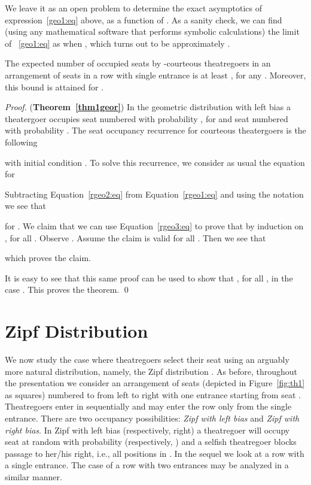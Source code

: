 \documentclass[11pt]{llncs}
\begin{document}
We leave it as an open problem to determine the exact asymptotics of expression~\eqref{geo1:eq} above, as a function of . As a sanity check, we can find (using any mathematical software that performs symbolic calculations) the limit of ~\eqref{geo1:eq} as  when , which turns out to be approximately . 



\begin{theorem}
\label{thm1geor}
The expected number of occupied seats by -courteous 
theatregoers in an arrangement of  seats
in a row with single entrance is at least , 
for any . Moreover, this bound is attained for .
\end{theorem}




\begin{proof} ({\bf Theorem~\ref{thm1geor}})
In the geometric distribution with left bias a theatergoer
occupies seat numbered  with probability
, for  and seat numbered 
with probability .
The seat occupancy
recurrence for courteous theatergoers is the following

with initial condition .
To solve this recurrence, we
consider as usual the equation for 

Subtracting Equation~\eqref{rgeo2:eq} from Equation~\eqref{rgeo1:eq}
and using the notation  we see that

for . We claim that we
can use Equation~\eqref{rgeo3:eq} to prove that
 by induction on , for all
. 
Observe .
Assume the claim is valid for all . Then we see that

which proves the claim.

It is easy to see that this same proof can be used to
show that , for all , in the
case . This proves the theorem.
\qed
\end{proof}



\section{Zipf Distribution}
\label{zipf:sec}

We now study the case where theatregoers
select their seat 
using an arguably more natural  distribution, namely, the Zipf distribution \cite{zipf}.
As before, throughout the presentation we
consider an arrangement of  seats 
(depicted in Figure~\ref{fig:th1} as squares) 
numbered  to  from left to right with
one entrance starting from seat . 
Theatregoers enter in sequentially 
and may enter the row only from the single entrance.
There are two occupancy possibilities: {\em Zipf with left bias} and
{\em Zipf with right bias}.
In Zipf with left bias (respectively, right) a 
theatregoer will occupy 
seat  at random with probability 
(respectively, )
and a selfish theatregoer
blocks passage 
to her/his right, i.e., all positions in 
. 
In the sequel we look at a row with a single
entrance. The case of a row with two entrances
may be analyzed in a similar manner.
\end{document}
